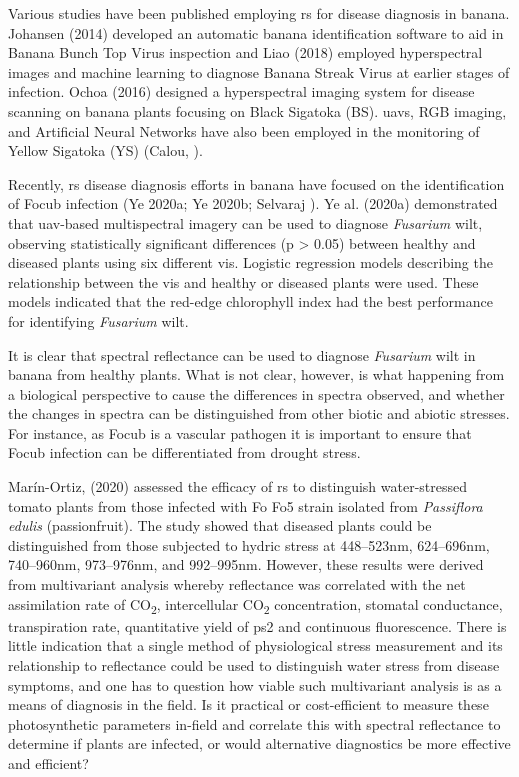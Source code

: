 Various studies have been published employing \ac{rs} for disease diagnosis in banana. Johansen \et (2014) developed an automatic banana identification software to aid in Banana Bunch Top Virus inspection and Liao \et (2018) employed hyperspectral images and machine learning to diagnose Banana Streak Virus at earlier stages of infection. Ochoa \et (2016) designed a hyperspectral imaging system for disease scanning on banana plants focusing on Black Sigatoka (BS). \ac{uavs}, RGB imaging, and Artificial Neural Networks have also been employed in the monitoring of Yellow Sigatoka (YS) (Calou, ).  

Recently, \ac{rs} disease diagnosis efforts in banana have focused on the identification of \ac{Focub} infection (Ye \et 2020a; Ye \et 2020b; Selvaraj ). Ye \et al. (2020a) demonstrated that \ac{uav}-based multispectral imagery can be used to diagnose \textit{Fusarium} wilt, observing statistically significant differences (p > 0.05) between healthy and diseased plants using six different \acp{vi}. Logistic regression models describing the relationship between the \acp{vi} and healthy or diseased plants were used. These models indicated that the red-edge chlorophyll index had the best performance for identifying \textit{Fusarium} wilt.  

It is clear that spectral reflectance can be used to diagnose \textit{Fusarium} wilt in banana from healthy plants. What is not clear, however, is what happening from a biological perspective to cause the differences in spectra observed, and whether the changes in spectra can be distinguished from other biotic and abiotic stresses. For instance, as \ac{Focub} is a vascular pathogen it is important to ensure that \ac{Focub} infection can be differentiated from drought stress.   

Marín-Ortiz, \et (2020) assessed the efficacy of \ac{rs} to distinguish water-stressed tomato plants from those infected with \ac{Fo} Fo5 strain isolated from \textit{Passiflora edulis }(passionfruit). The study showed that diseased plants could be distinguished from those subjected to hydric stress at 448–523nm, 624–696nm, 740–960nm, 973–976nm, and 992–995nm. However, these results were derived from multivariant analysis whereby reflectance was correlated with the net assimilation rate of CO\textsubscript{2}, intercellular CO\textsubscript{2} concentration, stomatal conductance, transpiration rate, quantitative yield of \ac{ps2} and continuous fluorescence. There is little indication that a single method of physiological stress measurement and its relationship to reflectance could be used to distinguish water stress from disease symptoms, and one has to question how viable such multivariant analysis is as a means of diagnosis in the field. Is it practical or cost-efficient to measure these photosynthetic parameters in-field and correlate this with spectral reflectance to determine if plants are infected, or would alternative diagnostics be more effective and efficient?   


